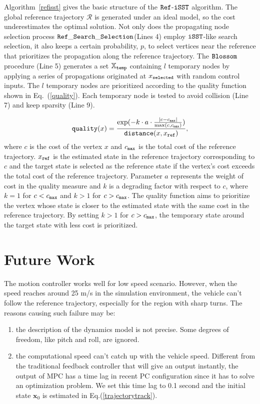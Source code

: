 \documentclass[conference, onecolumn]{IEEEtran}
\begin{document}
Algorithm~\ref{refisst} gives the basic structure of the $\tt Ref$-$\tt iSST$ algorithm. The global reference trajectory $\mathcal{R}$ is generated under an ideal model, so the cost underestimates the optimal solution. Not only does the propagating node selection process {$\tt Ref\_Search\_Selection$}(Lines 4) employ $\tt iSST$-like search selection, it also keeps a certain probability, $p$, to select vertices near the reference that prioritizes the propagation along the reference trajectory.
The $\tt Blossom$ procedure (Line 5) generates a set $\mathbb{X}_{\tt temp}$ containing $l$ temporary nodes by applying a series of propagations originated at $x_{\tt selected}$ with random control inputs. 
The $l$ temporary nodes are prioritized according to the quality function shown in Eq.~(\ref{quality}). Each temporary node is tested to avoid collision (Line 7) and keep sparsity (Line 9). %

\begin{equation}
	{\tt quality}(x) = 
		\frac{\exp(-k\cdot{a}\cdot{\frac{|c-c_{\tt max}|}{\max(c,c_{\tt max})})}}{{\tt distance}(x,x_{\tt ref})},
	\label{quality}
\end{equation}
where $c$ is the cost of the vertex $x$ and $c_{\tt max}$ is the total cost of the reference trajectory. $x_{\tt ref}$ is the estimated state in the reference trajectory corresponding to $c$ and the target state is selected as the reference state if the vertex's cost exceeds the total cost of the reference trajectory. Parameter $a$ represents the weight of cost in the quality measure and $k$ is a degrading factor with respect to $c$, where $k=1$ for $c<c_{\tt max}$ and $k>1$ for $c>c_{\tt max}$. The quality function aims to prioritize the vertex whose state is closer to the estimated state with the same cost in the reference trajectory. By setting $k>1$ for $c>c_{\tt max}$, the temporary state around the target state with less cost is prioritized.

\section{Future Work}
The motion controller works well for low speed scenario. However, when the speed reaches around 25 m/s in the simulation environment, the vehicle can't follow the reference trajectory, especially for the region with sharp turns. The reasons causing such failure may be:
\begin{enumerate}
	\item the description of the dynamics model is not precise. Some degrees of freedom, like pitch and roll, are ignored. 
	\item the computational speed can't catch up with the vehicle speed. Different from the traditional feedback controller that will give an output instantly, the output of MPC has a time lag in recent PC configuration since it has to solve an optimization problem. We set this time lag to 0.1 second and the initial state $\boldsymbol{x}_0$ is estimated in Eq.(\ref{trajectorytrack}).  
\end{enumerate}
\end{document}

